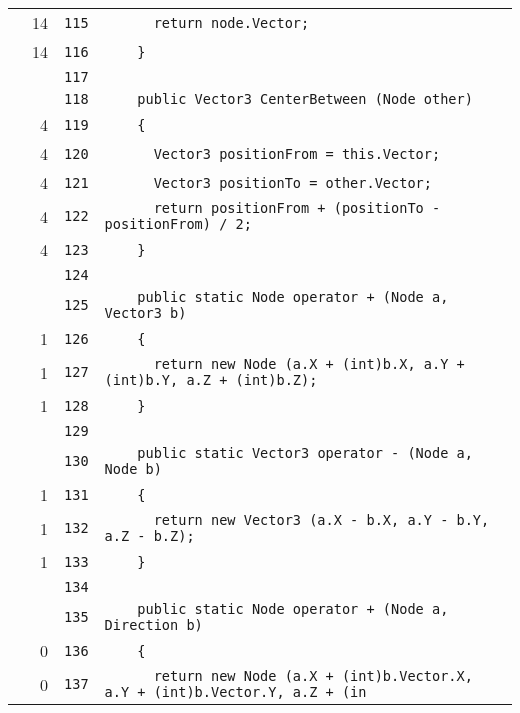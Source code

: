 \documentclass[a4paper,10pt]{article}
\begin{document}
\begin{longtable}[l]{lrrl}
\cellcolor{green} & 14 & \verb~115~ & \verb~      return node.Vector;~\\
\cellcolor{green} & 14 & \verb~116~ & \verb~    }~\\
\cellcolor{gray} &  & \verb~117~ & \verb~~\\
\cellcolor{gray} &  & \verb~118~ & \verb~    public Vector3 CenterBetween (Node other)~\\
\cellcolor{green} & 4 & \verb~119~ & \verb~    {~\\
\cellcolor{green} & 4 & \verb~120~ & \verb~      Vector3 positionFrom = this.Vector;~\\
\cellcolor{green} & 4 & \verb~121~ & \verb~      Vector3 positionTo = other.Vector;~\\
\cellcolor{green} & 4 & \verb~122~ & \verb~      return positionFrom + (positionTo - positionFrom) / 2;~\\
\cellcolor{green} & 4 & \verb~123~ & \verb~    }~\\
\cellcolor{gray} &  & \verb~124~ & \verb~~\\
\cellcolor{gray} &  & \verb~125~ & \verb~    public static Node operator + (Node a, Vector3 b)~\\
\cellcolor{green} & 1 & \verb~126~ & \verb~    {~\\
\cellcolor{green} & 1 & \verb~127~ & \verb~      return new Node (a.X + (int)b.X, a.Y + (int)b.Y, a.Z + (int)b.Z);~\\
\cellcolor{green} & 1 & \verb~128~ & \verb~    }~\\
\cellcolor{gray} &  & \verb~129~ & \verb~~\\
\cellcolor{gray} &  & \verb~130~ & \verb~    public static Vector3 operator - (Node a, Node b)~\\
\cellcolor{green} & 1 & \verb~131~ & \verb~    {~\\
\cellcolor{green} & 1 & \verb~132~ & \verb~      return new Vector3 (a.X - b.X, a.Y - b.Y, a.Z - b.Z);~\\
\cellcolor{green} & 1 & \verb~133~ & \verb~    }~\\
\cellcolor{gray} &  & \verb~134~ & \verb~~\\
\cellcolor{gray} &  & \verb~135~ & \verb~    public static Node operator + (Node a, Direction b)~\\
\cellcolor{red} & 0 & \verb~136~ & \verb~    {~\\
\cellcolor{red} & 0 & \verb~137~ & \verb~      return new Node (a.X + (int)b.Vector.X, a.Y + (int)b.Vector.Y, a.Z + (in~\\

\end{longtable}
\end{document}
